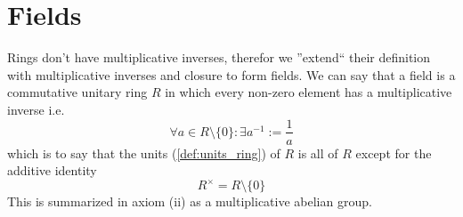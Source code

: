\section{Fields}
Rings don't have multiplicative inverses, therefor we ''extend`` their definition with multiplicative inverses and closure to form fields.
We can say that a field is a commutative unitary ring \(R\) in which every non-zero element has a multiplicative inverse i.e.
\[\forall a \in R\setminus\{0\}: \exists a^{-1} := \frac{1}{a}\]
which is to say that the units (\ref{def:units_ring}) of \(R\) is all of \(R\) except for the additive identity
\[R^\times = R\setminus\{0\}\]
This is summarized in axiom (ii) as a multiplicative abelian group.
% 
% 

